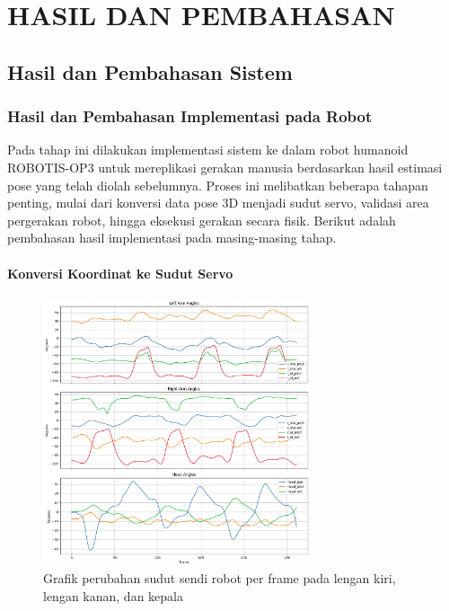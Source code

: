 \chapter{HASIL DAN PEMBAHASAN}
\vspace{1em}

\section{Hasil dan Pembahasan Sistem}
\subsection{Hasil dan Pembahasan Implementasi pada Robot}
Pada tahap ini dilakukan implementasi sistem ke dalam robot humanoid ROBOTIS-OP3 untuk mereplikasi gerakan manusia berdasarkan hasil estimasi pose yang telah diolah sebelumnya. Proses ini melibatkan beberapa tahapan penting, mulai dari konversi data pose 3D menjadi sudut servo, validasi area pergerakan robot, hingga eksekusi gerakan secara fisik. Berikut adalah pembahasan hasil implementasi pada masing-masing tahap.
\subsubsection{Konversi Koordinat ke Sudut Servo}

\begin{figure}[H]
    \centering
    \includegraphics[width=0.7\textwidth]{images/angles_per_joint.png}
    \caption{Grafik perubahan sudut sendi robot per frame pada lengan kiri, lengan kanan, dan kepala}
    \label{fig:angles_per_joint}
\end{figure}

